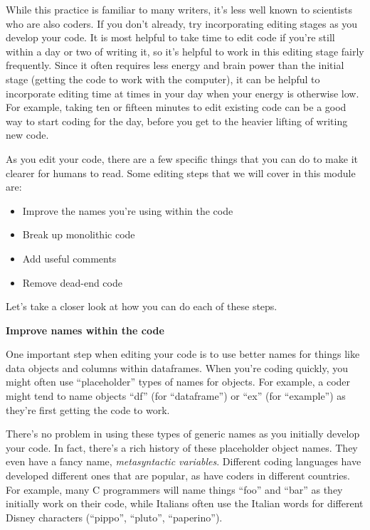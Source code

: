 \documentclass[]{tufte-book}
\providecommand{\tightlist}{%
  \setlength{\itemsep}{0pt}\setlength{\parskip}{0pt}}
\begin{document}
While this practice is familiar to many writers, it's less well known to
scientists who are also coders. If you don't already, try incorporating editing
stages as you develop your code. It is most helpful to take time to edit code if
you're still within a day or two of writing it, so it's helpful to work in this
editing stage fairly frequently. Since it often requires less energy and brain
power than the initial stage (getting the code to work with the computer), it
can be helpful to incorporate editing time at times in your day when your energy
is otherwise low. For example, taking ten or fifteen minutes to edit existing
code can be a good way to start coding for the day, before you get to the
heavier lifting of writing new code.

As you edit your code, there are a few specific things that you can do to make
it clearer for humans to read. Some editing steps that we will cover in this
module are:

\begin{itemize}
\tightlist
\item
  Improve the names you're using within the code
\item
  Break up monolithic code
\item
  Add useful comments
\item
  Remove dead-end code
\end{itemize}

Let's take a closer look at how you can do each of these steps.

\textbf{Improve names within the code}

One important step when editing your code is to use better names for things like
data objects and columns within dataframes. When you're coding quickly, you
might often use ``placeholder'' types of names for objects. For example, a coder
might tend to name objects ``df'' (for ``dataframe'') or ``ex'' (for ``example'') as
they're first getting the code to work.

There's no problem in using these types of generic names as you initially
develop your code. In fact, there's a rich history of these placeholder
object names. They even have a fancy name, \emph{metasyntactic variables}.
Different coding languages have developed different ones that are popular,
as have coders in different countries. For example, many C programmers will
name things ``foo'' and ``bar'' as they initially work on their code, while
Italians often use the Italian words for different Disney characters
(``pippo'', ``pluto'', ``paperino'').
\end{document}
